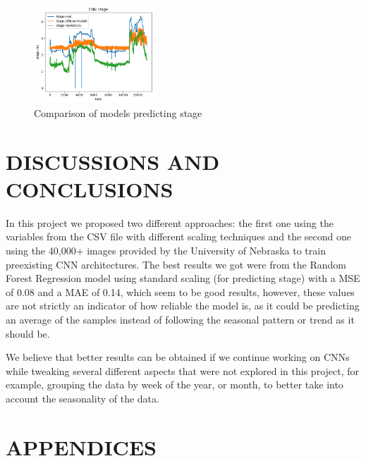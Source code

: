 \documentclass[conference]{IEEEtran}
\begin{document}
\begin{figure}[h]
\centering
\includegraphics[width=0.4\textwidth]{CNN-Stage.png}
\caption{Comparison of models predicting stage}
\end{figure}

\newpage
\section{DISCUSSIONS AND CONCLUSIONS}
In this project we proposed two different approaches: the first one using the variables from the CSV file with different scaling techniques and the second one using the 40,000+ images provided by the University of Nebraska to train preexisting CNN architectures.
The best results we got were from the Random Forest Regression model using standard scaling (for predicting stage) with a MSE of 0.08 and a MAE of 0.14, which seem to be good results, however, these values are not strictly an indicator of how reliable the model is, as it could be predicting an average of the samples instead of following the seasonal pattern or trend as it should be.

We believe that better results can be obtained if we continue working on CNNs while tweaking several different aspects that were not explored in this project, for example, grouping the data by week of the year, or month, to better take into account the seasonality of the data.

\newpage
\clearpage
\section{APPENDICES}
\end{document}
